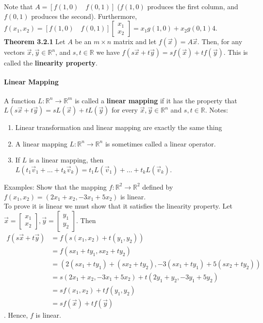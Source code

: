 \documentclass[10pt,letter]{article}
\begin{document}
Note that $A=[f(1,0)\quad f(0,1)]$ ($f(1,0)$ produces the first column, and $f(0,1)$ produces the second). Furthermore, $f(x_1,x_2)=[f(1,0)\quad f(0,1)]\begin{bmatrix}x_1\\x_2\end{bmatrix} = x_1g(1,0) +x_2g(0,1)4. $\\ 
\textbf{Theorem 3.2.1} Let $A$ be an $m\times n$ matrix and let $f(\vec{x})=A\vec{x}$. Then, for any vectors $\vec{x},\vec{y}\in\mathbb{R}^n$, and $s,t\in\mathbb{R}$ we have $f(s\vec{x}+t\vec{y}) = sf(\vec{x})+tf(\vec{y})$. This is called the \textbf{linearity property}. 

\paragraph{Linear Mapping} A function $L:\mathbb{R}^n\rightarrow\mathbb{R}^m$ is called a \textbf{linear mapping} if it has the property that $L(s\vec{x}+t\vec{y})=sL(\vec{x})+tL(\vec{y})$ for every $\vec{x},\vec{y}\in\mathbb{R}^n$ and $s,t\in\mathbb{R}$. Notes: \begin{enumerate}
    \item Linear transformation and linear mapping are exactly the same thing 
    \item A linear mapping $L:\mathbb{R}^n\rightarrow\mathbb{R}^n$ is sometimes called a linear operator. 
    \item If $L$ is a linear mapping, then $L(t_1\vec{v}_1+\ldots+t_k\vec{v}_k)=t_1L(\vec{v}_1)+\ldots+t_kL(\vec{v}_k)$. 
\end{enumerate}
Examples: Show that the mapping $f:\mathbb{R}^2\rightarrow\mathbb{R}^2$ defined by $f(x_1,x_2)=(2x_1+x_2,-3x_1+5x_2)$ is linear. \\ 
To prove it is linear we must show that it satisfies the linearity property. Let $\vec{x}=\begin{bmatrix}x_1\\x_2\end{bmatrix}, \vec{y}=\begin{bmatrix}y_1\\y_2\end{bmatrix}$. Then \begin{align*}f(s\vec{x}+t\vec{y})&=f(s(x_1,x_2)+t(y_1,y_2)) \\ &= f(sx_1+ty_1,sx_2+ty_2)\\ &= (2(sx_1+ty_1)+(sx_2+ty_2), -3(sx_1+ty_1)+5(sx_2+ty_2)) \\&= s(2x_1+x_2,-3x_1+5x_2)+t(2y_1+y_2,-3y_1+5y_2) \\&= sf(x_1,x_2)+tf(y_1,y_2)\\&=sf(\vec{x})+tf(\vec{y})\end{align*}. Hence, $f$ is linear. 
\end{document}
